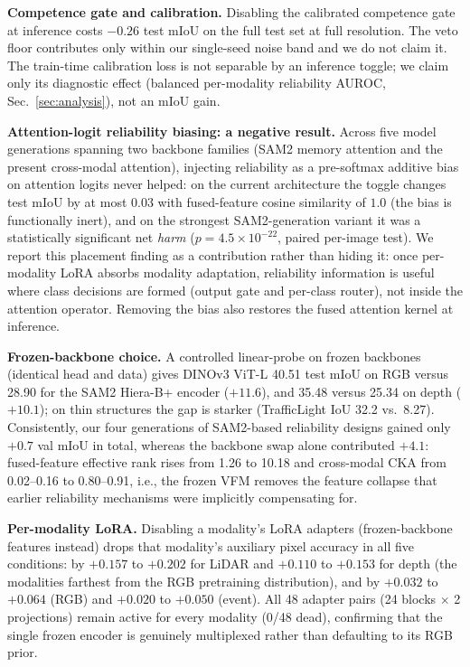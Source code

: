 \textbf{Competence gate and calibration.}
Disabling the calibrated competence gate at inference costs $-0.26$
test mIoU on the full test set at full resolution. The veto floor
contributes only within our single-seed noise band and we do not claim
it. The train-time calibration loss is not separable by an inference
toggle; we claim only its diagnostic effect (balanced per-modality
reliability AUROC, Sec.~\ref{sec:analysis}), not an mIoU gain.

\textbf{Attention-logit reliability biasing: a negative result.}
Across five model generations spanning two backbone families (SAM2
memory attention and the present cross-modal attention), injecting
reliability as a pre-softmax additive bias on attention logits never
helped: on the current architecture the toggle changes test mIoU by at
most $0.03$ with fused-feature cosine similarity of $1.0$ (the bias is
functionally inert), and on the strongest SAM2-generation variant it
was a statistically significant net \emph{harm}
($p=4.5\times10^{-22}$, paired per-image test). We report this
placement finding as a contribution rather than hiding it: once
per-modality LoRA absorbs modality adaptation, reliability information
is useful where class decisions are formed (output gate and per-class
router), not inside the attention operator. Removing the bias also
restores the fused attention kernel at inference.

\textbf{Frozen-backbone choice.}
A controlled linear-probe on frozen backbones (identical head and
data) gives DINOv3 ViT-L 40.51 test mIoU on RGB versus 28.90 for the
SAM2 Hiera-B+ encoder ($+11.6$), and 35.48 versus 25.34 on depth
($+10.1$); on thin structures the gap is starker (TrafficLight IoU
32.2 vs.\ 8.27). Consistently, our four generations of SAM2-based
reliability designs gained only $+0.7$ val mIoU in total, whereas the
backbone swap alone contributed $+4.1$: fused-feature effective rank
rises from 1.26 to 10.18 and cross-modal CKA from 0.02--0.16 to
0.80--0.91, i.e., the frozen VFM removes the feature collapse that
earlier reliability mechanisms were implicitly compensating for.

\textbf{Per-modality LoRA.}
Disabling a modality's LoRA adapters (frozen-backbone features
instead) drops that modality's auxiliary pixel accuracy in all five
conditions: by $+0.157$ to $+0.202$ for LiDAR and $+0.110$ to $+0.153$
for depth (the modalities farthest from the RGB pretraining
distribution), and by $+0.032$ to $+0.064$ (RGB) and $+0.020$ to
$+0.050$ (event). All 48 adapter pairs (24 blocks $\times$ 2
projections) remain active for every modality (0/48 dead), confirming
that the single frozen encoder is genuinely multiplexed rather than
defaulting to its RGB prior.

